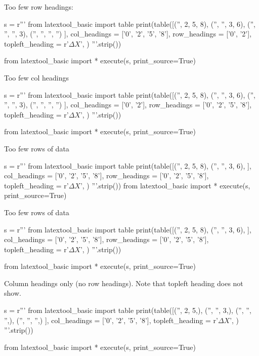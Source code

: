 \newpage
Too few row headings:
\begin{python}
s = r'''
from latextool_basic import table
print(table([('',  2, 5,  8),
             ('', '', 3,  6),
             ('', '', '', 3),
             ('', '', '', '')
            ],
            col_headings = ['0', '2', '5', '8'],
            row_headings = ['0', '2'],
            topleft_heading = r'$\Delta X$',
           )
'''.strip())

from latextool_basic import *
execute(s, print_source=True)
\end{python}


\newpage
Too few col headings
\begin{python}
s = r'''
from latextool_basic import table
print(table([('',  2, 5,  8),
             ('', '', 3,  6),
             ('', '', '', 3),
             ('', '', '', '')
            ],
            col_headings = ['0', '2'],
            row_headings = ['0', '2', '5', '8'],
            topleft_heading = r'$\Delta X$',
           )
'''.strip())

from latextool_basic import *
execute(s, print_source=True)
\end{python}


\newpage
Too few rows of data
\begin{python}
s = r'''
from latextool_basic import table
print(table([('',  2, 5,  8),
             ('', '', 3,  6),
            ],
            col_headings = ['0', '2', '5', '8'],
            row_headings = ['0', '2', '5', '8'],
            topleft_heading = r'$\Delta X$',
           )
'''.strip())
from latextool_basic import *
execute(s, print_source=True)
\end{python}


\newpage
Too few rows of data
\begin{python}
s = r'''
from latextool_basic import table
print(table([('',  2, 5,  8),
             ('', '', 3,  6),
            ],
            col_headings = ['0', '2', '5', '8'],
            row_headings = ['0', '2', '5', '8'],
            topleft_heading = r'$\Delta X$',
           )
'''.strip())

from latextool_basic import *
execute(s, print_source=True)
\end{python}


\newpage
Column headings only (no row headings).
Note that topleft heading does not show.

\begin{python}
s = r'''
from latextool_basic import table
print(table([('',  2, 5,),
             ('', '', 3,),
             ('', '', '',),
             ('', '', '',)
            ],
            col_headings = ['0', '2', '5', '8'],
            topleft_heading = r'$\Delta X$',
           )
'''.strip())

from latextool_basic import *
execute(s, print_source=True)
\end{python}


